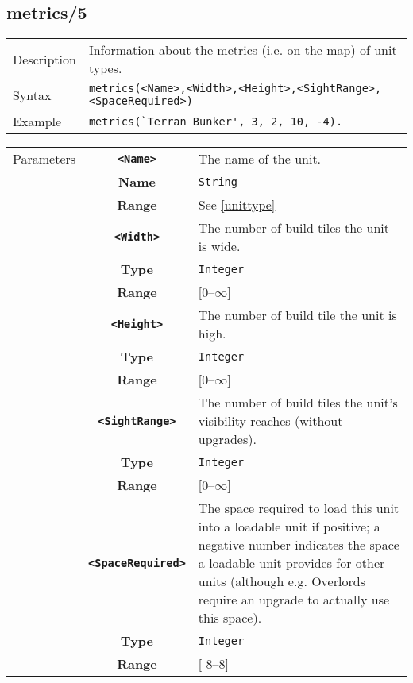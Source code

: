\subsection{metrics/5}
\begin{tabularx}{\textwidth}{lX}
 Description & Information about the metrics (i.e. on the map) of unit types. \\
 Syntax & \verb|metrics(<Name>,<Width>,<Height>,<SightRange>,<SpaceRequired>)| \\
 Example & \verb|metrics(`Terran Bunker', 3, 2, 10, -4).| \\
 \end{tabularx}
 \begin{tabularx}{\textwidth}{l | c | p{8cm}|}
 \cline{2-3}
 Parameters & \textbf{\verb|<Name>|} & The name of the unit.\\
            & \textbf{Name} & \verb|String| \\
            & \textbf{Range} & See \ref{unittype} \\
            \cline{2-3}
            & \textbf{\verb|<Width>|} & The number of build tiles the unit is wide.\\
            & \textbf{Type} & \verb|Integer| \\
            & \textbf{Range} & [0--$\infty$] \\
            \cline{2-3}
            & \textbf{\verb|<Height>|} & The number of build tile the unit is high.\\
            & \textbf{Type} & \verb|Integer| \\
            & \textbf{Range} & [0--$\infty$] \\
            \cline{2-3}
            & \textbf{\verb|<SightRange>|} & The number of build tiles the unit's visibility reaches (without upgrades). \\
            & \textbf{Type} & \verb|Integer| \\
            & \textbf{Range} & [0--$\infty$] \\
            \cline{2-3}
            & \textbf{\verb|<SpaceRequired>|} & The space required to load this unit into a loadable unit if positive; a negative number indicates the space a loadable unit provides for other units (although e.g. Overlords require an upgrade to actually use this space).\\
            & \textbf{Type} & \verb|Integer| \\
            & \textbf{Range} & [-8--8] \\
            \cline{2-3}
\end{tabularx}

